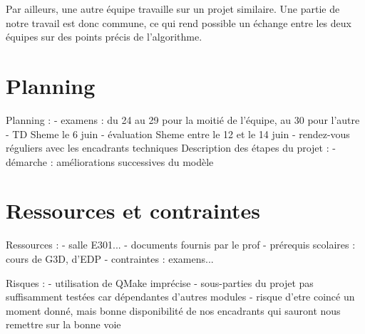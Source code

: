 \documentclass[12pt]{article}
\begin{document}
Par ailleurs, une autre équipe travaille sur un projet similaire. Une partie de notre travail est donc commune, ce qui rend possible un échange entre les deux équipes sur des points précis de l'algorithme.

\section{Planning}

Planning :
- examens : du 24 au 29 pour la moitié de l'équipe, au 30 pour l'autre
- TD Sheme le 6 juin
- évaluation Sheme entre le 12 et le 14 juin
- rendez-vous réguliers avec les encadrants techniques
Description des étapes du projet :
- démarche : améliorations successives du modèle

\section{Ressources et contraintes}

Ressources :
- salle E301...
- documents fournis par le prof
- prérequis scolaires : cours de G3D, d'EDP
- contraintes : examens...

Risques :
- utilisation de QMake imprécise
- sous-parties du projet pas suffisamment testées car dépendantes d'autres modules
- risque d'etre coincé un moment donné, mais bonne disponibilité de nos encadrants qui sauront nous remettre sur la bonne voie
\end{document}
